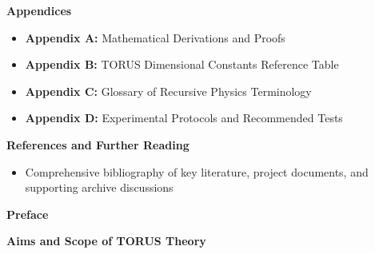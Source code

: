 \documentclass[]{article}
\begin{document}
\textbf{Appendices}

\begin{itemize}
\item
  \textbf{Appendix A:} Mathematical Derivations and Proofs
\item
  \textbf{Appendix B:} TORUS Dimensional Constants Reference Table
\item
  \textbf{Appendix C:} Glossary of Recursive Physics Terminology
\item
  \textbf{Appendix D:} Experimental Protocols and Recommended Tests
\end{itemize}

\textbf{References and Further Reading}

\begin{itemize}
\item
  Comprehensive bibliography of key literature, project documents, and
  supporting archive discussions
\end{itemize}

\textbf{Preface}

\textbf{Aims and Scope of TORUS Theory}
\end{document}
